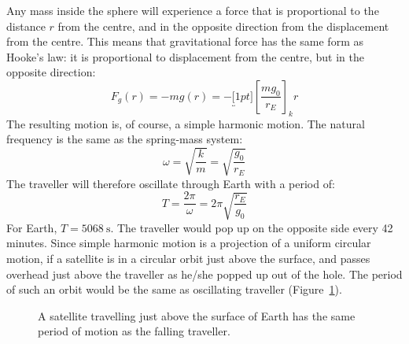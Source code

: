 Any mass inside the sphere will experience a force that is proportional to the
distance $r$ from the centre, and in the opposite direction from the
displacement from the centre. This means that gravitational force has the same
form as Hooke's law: it is proportional to displacement from the centre, but in
the opposite direction:
\begin{equation*}
  F_g(r)=-mg(r)=-\underbracket[1pt]{\left[\frac{mg_0}{r_E}\right]}_k r
\end{equation*}
The resulting motion is, of course, a simple harmonic motion. The natural
frequency is the same as the spring-mass system:
\begin{equation*}
  \omega=\sqrt{\frac km}=\sqrt{\frac{g_0}{r_E}}
\end{equation*}
The traveller will therefore oscillate through Earth with a period of:
\begin{equation}
  T=\frac{2\pi}\omega=2\pi\sqrt{\frac{r_E}{g_0}}
\end{equation}
For Earth, $T=\SI{5068}\second$. The traveller would pop up on the opposite
side every 42 minutes. Since simple harmonic motion is a projection of a
uniform circular motion, if a satellite is in a circular orbit just above the
surface, and passes overhead just above the traveller as he/she popped up out
of the hole. The period of such an orbit would be the same as oscillating
traveller (Figure~\ref{fig:withsatellite}).
\begin{figure}[ht]
  \centering
  \caption{A satellite travelling just above the surface of Earth has the
    same period of motion as the falling traveller.}
  \label{fig:withsatellite}
\end{figure}


